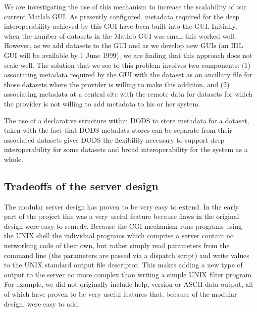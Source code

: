 \documentclass[12pt]{article}
\begin{document}
We are investigating the use of this mechanism to increase the scalability of
our current Matlab \ac{GUI}. As presently configured, metadata required for
the deep interoperability achieved by this \ac{GUI} have been built into the
\ac{GUI}.
Initially, when the number of datasets in the Matlab \ac{GUI} was small this
worked well.  However, as we add datasets to the \ac{GUI} and as we develop
new \ac{GUI}s (an IDL \ac{GUI} will be available by 1 June 1999), we are
finding that this approach does not scale well.
The solution that we see to this problem involves two components: (1)
associating metadata required by the \ac{GUI} with the dataset as an
ancillary file for those datasets where the provider is willing to make this
addition, and (2) associating metadata at a central site with the remote
data for datasets for which the provider is not willing to add metadata 
to his or her system.

The use of a declarative structure within \ac{DODS} to store metadata for a
dataset, taken with the fact that \ac{DODS} metadata stores can be separate
from their associated datasets gives \ac{DODS} the flexibility necessary to
support deep interoperability for some datasets and broad interoperability
for the system as a whole.

\subsection{Tradeoffs of the server design}
\label{dserver}

The modular server design has proven to be very easy to extend. In the early
part of the project this was a very useful feature because flaws in the
original design were easy to remedy. Because the \ac{CGI} mechanism runs
programs using the UNIX shell the individual programs which comprise a server
contain no networking code of their own, but rather simply read parameters
from the command line (the parameters are passed via a dispatch script) and
write values to the UNIX standard output file descriptor. This makes adding a
new type of output to the server no more complex than writing a simple UNIX
filter program. For example, we did not originally include help, version or
ASCII data output, all of which have proven to be very useful features that,
because of the modular design, were easy to add.
\end{document}
